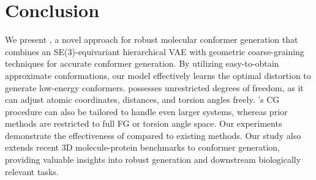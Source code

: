 \section{Conclusion}
\vspace{-2ex}
We present \modelns, a novel approach for robust molecular conformer generation that combines an SE(3)-equivariant hierarchical VAE with geometric coarse-graining techniques for accurate conformer generation. By utilizing easy-to-obtain approximate conformations, our model effectively learns the optimal distortion to generate low-energy conformers. \model possesses unrestricted degrees of freedom, as it can adjust atomic coordinates, distances, and torsion angles freely. \modelns's CG procedure can also be tailored to handle even larger systems, whereas prior methods are restricted to full FG or torsion angle space.
Our experiments demonstrate the effectiveness of \model compared to existing methods. Our study also extends recent 3D molecule-protein benchmarks to conformer generation, providing valuable insights into robust generation and downstream biologically relevant tasks.